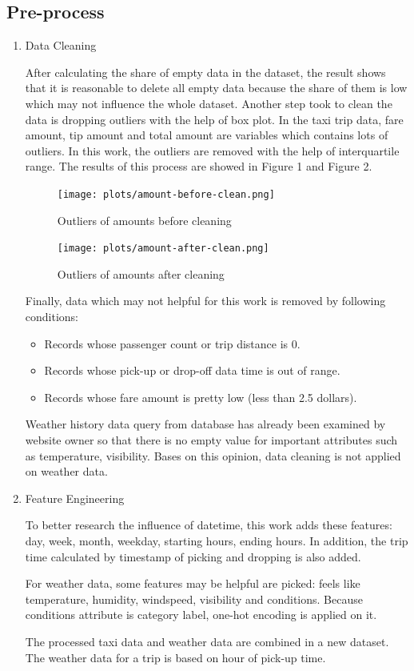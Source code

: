 \documentclass[11pt]{article}
\begin{document}
\subsection{Pre-process}
\begin{enumerate}
    \item Data Cleaning

After calculating the share of empty data in the dataset, the result shows that it is reasonable to delete all empty data because the share of them is low which may not influence the whole dataset. Another step took to clean the data is dropping outliers with the help of box plot. In the taxi trip data, fare amount, tip amount and total amount are variables which contains lots of outliers. In this work, the outliers are removed with the help of interquartile range. The results of this process are showed in Figure 1 and Figure 2.

\begin{figure}[h]
\centering
\begin{minipage}[t]{0.48\textwidth}
\centering
    \texttt{[image: plots/amount-before-clean.png]}
    \caption{Outliers of amounts before cleaning}
\end{minipage}
\begin{minipage}[t]{0.48\textwidth}
\centering
    \texttt{[image: plots/amount-after-clean.png]}
    \caption{Outliers of amounts after cleaning}
\end{minipage}
\end{figure}

Finally, data which may not helpful for this work is removed by following conditions:
\begin{itemize} 
    \item Records whose passenger count or trip distance is 0.
    \item Records whose pick-up or drop-off data time is out of range.
    \item Records whose fare amount is pretty low (less than 2.5 dollars).
\end{itemize} 

Weather history data query from database has already been examined by website owner so that there is no empty value for important attributes such as temperature, visibility. Bases on this opinion, data cleaning is not applied on weather data.

    \item Feature Engineering
    
To better research the influence of datetime, this work adds these features: day, week, month, weekday, starting hours, ending hours. In addition, the trip time calculated by timestamp of picking and dropping is also added.

For weather data, some features may be helpful are picked: feels like temperature, humidity, windspeed, visibility and conditions. Because conditions attribute is category label, one-hot encoding is applied on it.

The processed taxi data and weather data are combined in a new dataset. The weather data for a trip is based on hour of pick-up time.
    
\end{enumerate}
\end{document}
